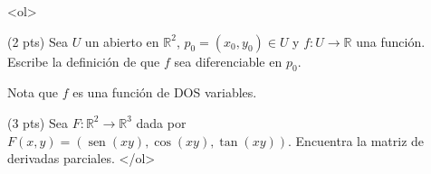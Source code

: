 \documentclass[12pt]{article}
\newcommand{\sen}{\operatorname{sen}}
\begin{document}
\bigskip

            
\bigskip
\bigskip
\bigskip


<ol>

\item (2 pts) Sea $U$ un abierto en $\mathbb{R}^2$, $p_0=(x_0,y_0)\in U$
  y $f:U\to \mathbb{R}$ una
  función. Escribe la definición de que $f$ sea diferenciable en $p_0$.

  Nota  que $f$ es una función de DOS variables.
  
  
\vspace{5cm}  
  
\item (3 pts) Sea $F:\mathbb{R}^2 \to \mathbb{R}^3$ dada por $F(x,y)=(\sen(xy), \cos(xy),\tan(xy))$.
  Encuentra la matriz de derivadas parciales.
  </ol>


  
\end{document}
